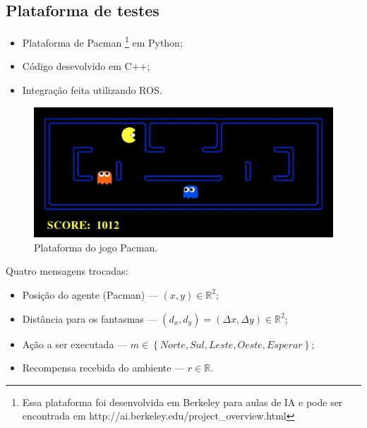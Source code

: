 \documentclass{beamer}
\begin{document}

\subsection{Plataforma de testes}

\begin{frame}
\begin{itemize}
	\item Plataforma de Pacman%
		\footnote{Essa plataforma foi desenvolvida em Berkeley para aulas de IA e pode ser encontrada em http://ai.berkeley.edu/project\_overview.html%
		} em Python;
	\item Código desevolvido em C++;
	\item Integração feita utilizando ROS.
\end{itemize}

\begin{figure}[h]
    \centering
    \includegraphics[width=0.7\linewidth]{images/pacman_platform}
    \caption{\label{img:PlataformaSimulacaoPacman}Plataforma do jogo Pacman.}
\end{figure}
\end{frame}


\begin{frame}
Quatro mensagens trocadas:\pause
\begin{itemize}
	\item Posição do agente (Pacman) --- $ \left( x, y \right) \in \mathbb{R}^2 $;\pause
	\item Distância para os fantasmas --- $ \left( d_x, d_y \right) = \left( \Delta x, \Delta y \right) \in \mathbb{R}^2 $;\pause
	\item Ação a ser executada --- $ m \in \left\{Norte, Sul, Leste, Oeste, Esperar \right\} $;\pause
	\item Recompensa recebida do ambiente --- $ r \in \mathbb{R} $.
\end{itemize}
\end{frame}
\end{document}
